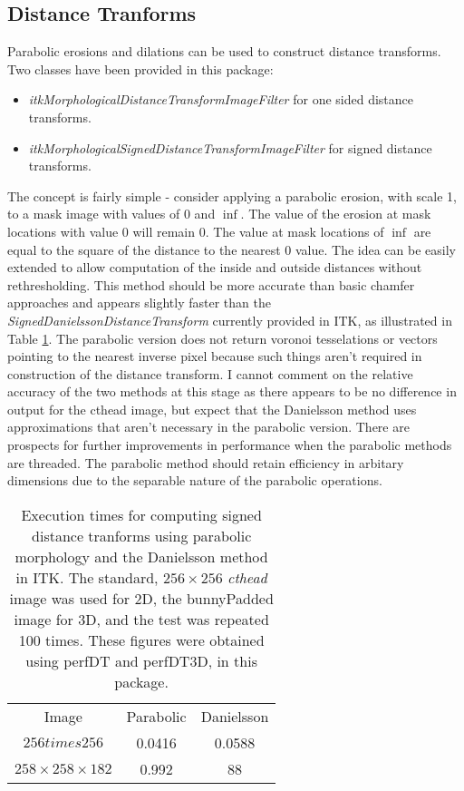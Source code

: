 \documentclass{InsightArticle}
\begin{document}
\subsection{Distance Tranforms}
Parabolic erosions and dilations can be used to construct distance
transforms. Two classes have been provided in this package:
\begin{itemize}
\item {\em itkMorphologicalDistanceTransformImageFilter} for one sided distance transforms.
\item {\em itkMorphologicalSignedDistanceTransformImageFilter} for signed distance transforms.
\end{itemize}
The concept is fairly simple - consider applying a parabolic erosion,
with scale 1, to a mask image with values of $0$ and $\inf$. The value
of the erosion at mask locations with value 0 will remain 0. The value
at mask locations of $\inf$ are equal to the square of the distance to
the nearest 0 value. The idea can be easily extended to allow
computation of the inside and outside distances without
rethresholding. This method should be more accurate than basic chamfer
approaches and appears slightly faster than the {\em
  SignedDanielssonDistanceTransform} currently provided in ITK, as
illustrated in Table \ref{tbl:perf}. The parabolic version does not
return voronoi tesselations or vectors pointing to the nearest inverse
pixel because such things aren't required in construction of the
distance transform. I cannot comment on the relative accuracy of the
two methods at this stage as there appears to be no difference in
output for the cthead image, but expect that the Danielsson method
uses approximations that aren't necessary in the parabolic
version. There are prospects for further improvements in performance
when the parabolic methods are threaded. The parabolic method should
retain efficiency in arbitary dimensions due to the separable nature
of the parabolic operations.
\begin{table}[phtb]
\centering
\begin{tabular}{ccc}
\hline
Image & Parabolic &  Danielsson \\
$256 times 256$ & 0.0416  & 0.0588 \\
$258 \times 258 \times 182$ & 0.992 & 88\\
\hline
\end{tabular}
\caption{Execution times for computing signed distance tranforms using parabolic morphology and the Danielsson method in ITK. The standard, $256 \times 256$ {\em cthead} image was used for 2D, the bunnyPadded image for 3D, and the test was repeated 100 times. These figures were obtained using perfDT and perfDT3D, in this package.\label{tbl:perf}}
\end{table}
\end{document}
